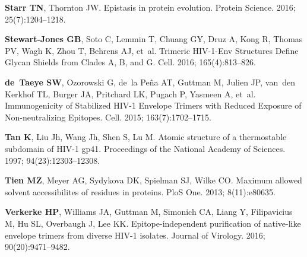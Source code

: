\documentclass[9pt]{elife}
\begin{document}
\begin{thebibliography}{114}
\textbf{\color{eLifeMediumGrey} Starr TN}, Thornton JW.
\newblock Epistasis in protein evolution.
\newblock Protein Science.  2016; 25(7):1204--1218.

\textbf{\color{eLifeMediumGrey} Stewart-Jones GB}, Soto C, Lemmin T, Chuang GY,
  Druz A, Kong R, Thomas PV, Wagh K, Zhou T, Behrens AJ, et~al.
\newblock Trimeric {HIV-1-Env} Structures Define Glycan Shields from Clades {A,
  B, and G}.
\newblock Cell.  2016; 165(4):813--826.

\textbf{\color{eLifeMediumGrey} de~Taeye SW}, Ozorowski G, de~la Pe{\~n}a AT,
  Guttman M, Julien JP, van~den Kerkhof TL, Burger JA, Pritchard LK, Pugach P,
  Yasmeen A, et~al.
\newblock Immunogenicity of Stabilized HIV-1 Envelope Trimers with Reduced
  Exposure of Non-neutralizing Epitopes.
\newblock Cell.  2015; 163(7):1702--1715.

\textbf{\color{eLifeMediumGrey} Tan K}, Liu Jh, Wang Jh, Shen S, Lu M.
\newblock Atomic structure of a thermostable subdomain of HIV-1 gp41.
\newblock Proceedings of the National Academy of Sciences.  1997;
  94(23):12303--12308.

\textbf{\color{eLifeMediumGrey} Tien MZ}, Meyer AG, Sydykova DK, Spielman SJ,
  Wilke CO.
\newblock Maximum allowed solvent accessibilites of residues in proteins.
\newblock PloS One.  2013; 8(11):e80635.

\textbf{\color{eLifeMediumGrey} Verkerke HP}, Williams JA, Guttman M, Simonich
  CA, Liang Y, Filipavicius M, Hu SL, Overbaugh J, Lee KK.
\newblock Epitope-independent purification of native-like envelope trimers from
  diverse {HIV-1} isolates.
\newblock Journal of Virology.  2016; 90(20):9471--9482.


\end{thebibliography}
\end{document}
